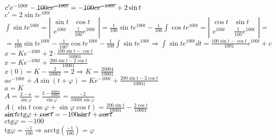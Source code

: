 $c'e^{-100t}-\cancel{100ce^{-100t}}=-\cancel{100ce^{-100t}}+2\sin t$\\
$c'=2\sin t e^{100t}$\\
$\int \sin t e^{100t}=\left|\begin{array}{cc}\sin t & \cos t \\ e^{100t} & \frac{1}{100}e^{100t}\end{array}\right|=\frac{1}{100}\sin t e^{100t}-\frac{1}{100} \int \cos t e^{100t}=\left|\begin{array}{cc}\cos t & \sin t \\ e^{100t} & \frac{1}{100}e^{100t}\end{array}\right|=$\\
$=\frac{1}{100}\sin t e^{100t}-\frac{1}{100^2}\cos t e^{100t}-\frac{1}{100} \int \sin t e^{100t} \Rightarrow \int \sin t e^{100t} dt = \boxed{\frac{100\sin t - \cos t}{1001}e^{100t}+c}$\\
$\boxed{x=Ke^{-100t}+2\cdot\frac{100\sin t - \cos t}{10001}}$\\
$x=Ke^{-100t}+\frac{200\sin t -2\cos t}{10001}$\\
$x(0)=K-\frac{2}{10001}=2 \Rightarrow K=\frac{20004}{10001}$\\
$ae^{-100t}+A\sin(t+\varphi)=Ke^{-100t}+\frac{200\sin t - 2 \cos t}{10001}$\\
$a=K$\\
$A=\frac{2-a}{\sin \varphi}=\frac{2-\frac{20004}{10001}}{\sin \varphi}=\frac{-2}{1000t\sin\varphi}$\\
$A(\sin t \cos \varphi + \sin \varphi \cos t)=\frac{200\sin t}{10001}-\frac{2\cos t}{10001}$\\
$\cancel{\sin t}\text{ctg}\varphi+\cancel{\cos t}=-100\cancel{\sin t}+\cancel{\cos t}$\\
$\text{ctg}\varphi= -100$\\
$\text{tg}\varphi=\frac{-1}{100} \Rightarrow \boxed{\text{arctg}(\frac{-1}{100})=\varphi}$\\


\pagebreak

